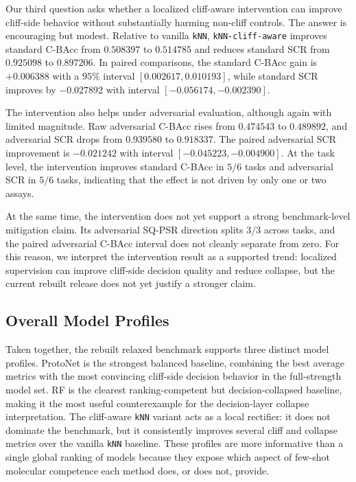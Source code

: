 \documentclass{article}
\begin{document}
Our third question asks whether a localized cliff-aware intervention can improve cliff-side behavior without
substantially harming non-cliff controls. The answer is encouraging but modest. Relative to vanilla \texttt{kNN},
\texttt{kNN-cliff-aware} improves standard C-BAcc from $0.508397$ to $0.514785$ and reduces standard SCR from
$0.925098$ to $0.897206$. In paired comparisons, the standard C-BAcc gain is $+0.006388$ with a $95\%$ interval
$[0.002617, 0.010193]$, while standard SCR improves by $-0.027892$ with interval
$[-0.056174, -0.002390]$.

The intervention also helps under adversarial evaluation, although again with limited magnitude. Raw adversarial
C-BAcc rises from $0.474543$ to $0.489892$, and adversarial SCR drops from $0.939580$ to $0.918337$. The paired
adversarial SCR improvement is $-0.021242$ with interval $[-0.045223, -0.004900]$. At the task level, the
intervention improves standard C-BAcc in $5/6$ tasks and adversarial SCR in $5/6$ tasks, indicating that the
effect is not driven by only one or two assays.

At the same time, the intervention does not yet support a strong benchmark-level mitigation claim. Its adversarial
SQ-PSR direction splits $3/3$ across tasks, and the paired adversarial C-BAcc interval does not cleanly separate
from zero. For this reason, we interpret the intervention result as a supported trend: localized supervision can
improve cliff-side decision quality and reduce collapse, but the current rebuilt release does not yet justify a
stronger claim.

\subsection{Overall Model Profiles}

Taken together, the rebuilt relaxed benchmark supports three distinct model profiles. ProtoNet is the strongest
balanced baseline, combining the best average metrics with the most convincing cliff-side decision behavior in the
full-strength model set. RF is the clearest ranking-competent but decision-collapsed baseline, making it the most
useful counterexample for the decision-layer collapse interpretation. The cliff-aware \texttt{kNN} variant acts as
a local rectifier: it does not dominate the benchmark, but it consistently improves several cliff and collapse
metrics over the vanilla \texttt{kNN} baseline. These profiles are more informative than a single global ranking of
models because they expose which aspect of few-shot molecular competence each method does, or does not, provide.
\end{document}
